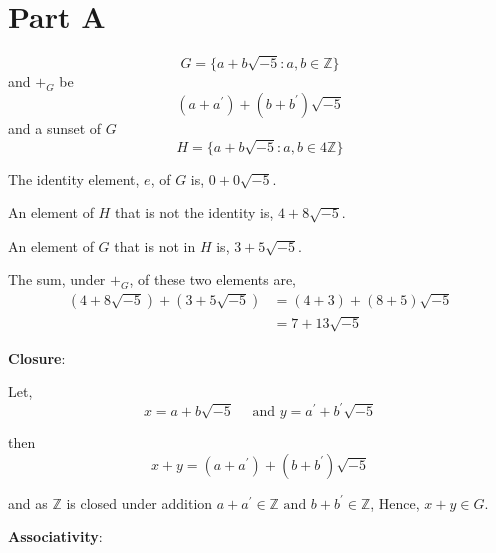 \documentclass{tufte-handout}
\begin{document}

\section{Part A}

\begin{question}

\end{question}


\begin{question}

\[ G = \{ a + b\sqrt{-5} : a,b \in \mathbb{Z} \} \]
and \( \boldsymbol{+}_{G} \) be
\[ (a + a^\prime) + (b + b^\prime)\sqrt{-5} \]
and a sunset of \( G \)
\[ H = \{ a + b\sqrt{-5} : a,b \in 4\mathbb{Z} \} \]

\vspace{1cm}

\qpart

\qsubpart

The identity element, \( e \), of \( G \) is, \( 0 + 0\sqrt{-5} \).

\qsubpart

An element of \( H \) that is not the identity is, \( 4 + 8\sqrt{-5} \).

\qsubpart

An element of \( G \) that is not in \( H \) is, \( 3 + 5\sqrt{-5} \).

\qsubpart

The sum, under \( \boldsymbol{+}_{G} \), of these two elements are,
\begin{align*}
(4 + 8\sqrt{-5}) + (3 + 5\sqrt{-5}) &= (4 + 3) + (8 + 5)\sqrt{-5}\\
&= 7 + 13\sqrt{-5}
\end{align*}

\vspace{5cm}

\qpart

\textbf{Closure}:

Let,
\[ x = a + b\sqrt{-5} \quad \text{ and } y = a^\prime + b^\prime\sqrt{-5} \]

then
\[ x + y = (a + a^\prime) + (b + b^\prime)\sqrt{-5} \]

and as \( \mathbb{Z} \) is closed under addition \( a + a^\prime \in \mathbb{Z} \text{ and } b + b^\prime \in \mathbb{Z}\),
Hence, \( x + y \in G \).

\vspace{2cm}

\textbf{Associativity}:


\end{question}
\end{document}
